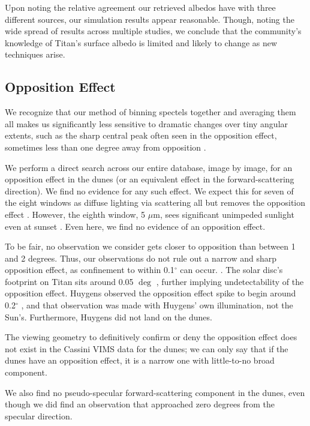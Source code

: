 \documentclass[twocolumn,linenumbers]{aastex631}
\begin{document}
Upon noting the relative agreement our retrieved albedos have with three different sources, our simulation results appear reasonable. Though, noting the wide spread of results across multiple studies, we conclude that the community's knowledge of Titan's surface albedo is limited and likely to change as new techniques arise.

\subsection{Opposition Effect} \label{sec:oppC}

We recognize that our method of binning spectels together and averaging them all makes us significantly less sensitive to dramatic changes over tiny angular extents, such as the sharp central peak often seen in the opposition effect, sometimes less than one degree away from opposition \citep{Kulyk2008, Schaefer2008}. 

We perform a direct search across our entire database, image by image, for an opposition effect in the dunes (or an equivalent effect in the forward-scattering direction). We find no evidence for any such effect. We expect this for seven of the eight windows as diffuse lighting via scattering all but removes the opposition effect \citep{Schroder2008}. However, the eighth window, 5 $\mu$m, sees significant unimpeded sunlight even at sunset \citep{Barnes2018b}. Even here, we find no evidence of an opposition effect.

To be fair, no observation we consider gets closer to opposition than between 1 and 2 degrees. Thus, our observations do not rule out a narrow and sharp opposition effect, as confinement to within 0.1$^{\circ}$ can occur. \citep{Kulyk2008, Schaefer2008}. The solar disc's footprint on Titan sits around 0.05 $\deg$ \citep{Barnes2011}, further implying undetectability of the opposition effect. Huygens observed the opposition effect spike to begin around 0.2$^{\circ}$ \citep{Karkoschka2012}, and that observation was made with Huygens' own illumination, not the Sun's. Furthermore, Huygens did not land on the dunes. 

The viewing geometry to definitively confirm or deny the opposition effect does not exist in the Cassini VIMS data for the dunes; we can only say that if the dunes have an opposition effect, it is a narrow one with little-to-no broad component.

We also find no pseudo-specular forward-scattering component in the dunes, even though we did find an observation that approached zero degrees from the specular direction.
\end{document}
